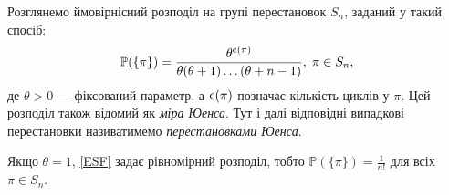 Розглянемо ймовірнісний розподіл на групі перестановок $S_n$, 
заданий у такий спосіб:
\begin{equation}\label{ESF}
    \mathbb{P}(\{\pi\}) = \frac{
        \theta^{\operatorname{c}(\pi)}
    }{
        \theta (\theta + 1) \dots (\theta + n - 1)
    }, \; \pi \in S_n,
\end{equation}
де $\theta > 0$ --- фіксований параметр, а $\operatorname{c}(\pi)$ позначає кількість циклів у $\pi$.
Цей розподіл також відомий як
\emph{міра Юенса}. Тут і далі
відповідні випадкові перестановки називатимемо
\emph{перестановками Юенса}.

\begin{remark}
    Якщо $\theta = 1$, \eqref{ESF} задає рівномірний розподіл,
    тобто $\mathbb{P}(\{\pi\}) = \frac{1}{n!}$ для всіх $\pi \in S_n$.
\end{remark}

